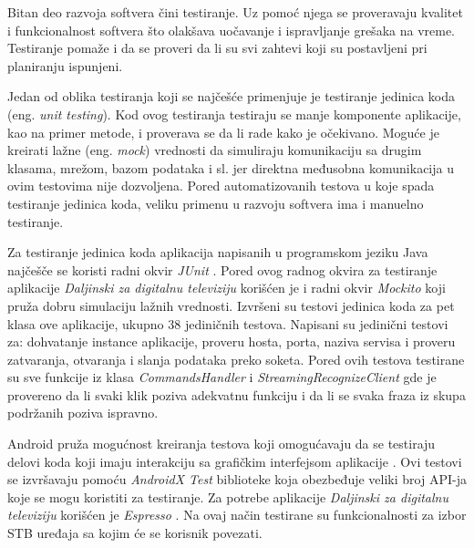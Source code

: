 \documentclass[../TamaraIvanovicMasterRad.tex]{subfiles}
\begin{document}
Bitan deo razvoja softvera čini testiranje. \cite{book:testiranjeRigorousSoftwareDev} Uz pomoć njega se proveravaju kvalitet i funkcionalnost softvera što olakšava uočavanje i ispravljanje grešaka na vreme. Testiranje pomaže i da se proveri da li su svi zahtevi koji su postavljeni pri planiranju ispunjeni. 

Jedan od oblika testiranja koji se najčešće primenjuje je testiranje jedinica koda (eng. \textit{unit testing}). Kod ovog testiranja testiraju se manje komponente aplikacije, kao na primer metode, i proverava se da li rade kako je očekivano. Moguće je kreirati lažne (eng. \textit{mock}) vrednosti da simuliraju komunikaciju sa drugim klasama, mrežom, bazom podataka i sl. jer direktna međusobna komunikacija u ovim testovima nije dozvoljena. Pored automatizovanih testova u koje spada testiranje jedinica koda, veliku primenu u razvoju softvera ima i manuelno testiranje. 

Za testiranje jedinica koda aplikacija napisanih u programskom jeziku Java najčešče se koristi radni okvir \textit{JUnit} \cite{sajt:junit}. Pored ovog radnog okvira za testiranje aplikacije \textit{Daljinski za digitalnu televiziju} korišćen je i radni okvir \textit{Mockito} \cite{sajt:mockito} koji pruža dobru simulaciju lažnih vrednosti. Izvršeni su testovi jedinica koda za pet klasa ove aplikacije, ukupno 38 jediničnih testova. Napisani su jedinični testovi za: dohvatanje instance aplikacije, proveru hosta, porta, naziva servisa i proveru zatvaranja, otvaranja i slanja podataka preko soketa. Pored ovih testova testirane su sve funkcije iz klasa \textit{CommandsHandler} i \textit{StreamingRecognizeClient} gde je provereno da li svaki klik poziva adekvatnu funkciju i da li se svaka fraza iz skupa podržanih poziva ispravno.

Android pruža mogućnost kreiranja testova koji omogućavaju da se testiraju delovi koda koji imaju interakciju sa grafičkim interfejsom aplikacije \cite{sajt:instrumentedT}. Ovi testovi se izvršavaju pomoću \textit{AndroidX Test} biblioteke koja obezbeđuje veliki broj API-ja koje se mogu koristiti za testiranje. Za potrebe aplikacije \textit{Daljinski za digitalnu televiziju} korišćen je \textit{Espresso} \cite{sajt:espresspT}. Na ovaj način testirane su funkcionalnosti za izbor STB uređaja sa kojim će se korisnik povezati. 
\end{document}
